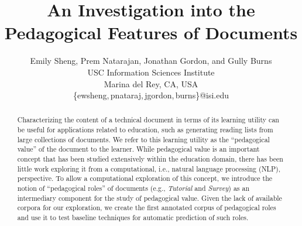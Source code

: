 \documentclass[11pt,a4paper]{article}
\title{An Investigation into the Pedagogical Features of Documents}
\author{
  Emily Sheng{\rm ,}
  Prem Natarajan{\rm ,}
  Jonathan Gordon{\rm , and}
  Gully Burns \\
  USC Information Sciences Institute \\
  Marina del Rey, CA, USA \\
  \{ewsheng,\,pnataraj,\,jgordon,\,burns\}@isi.edu
}
\date{}
\begin{document}

\maketitle

\begin{abstract}

Characterizing the content of a technical document in terms of its learning utility can be useful for applications related to education, such as generating reading lists from large collections of documents. We refer to this learning utility as the ``pedagogical value'' of the document to the learner. While pedagogical value is an important concept that has been studied extensively within the education domain, there has been little work exploring it from a computational, i.e., natural language processing (NLP), perspective. To allow a computational exploration of this concept, we introduce the notion of ``pedagogical roles'' of documents (e.g., \textit{Tutorial} and \textit{Survey}) as an intermediary component for the study of pedagogical value. Given the lack of available corpora for our exploration, we create the first annotated corpus of pedagogical roles and use it to test baseline techniques for automatic prediction of such roles.
%
%
%
%
%
%
\end{abstract}
\end{document}
